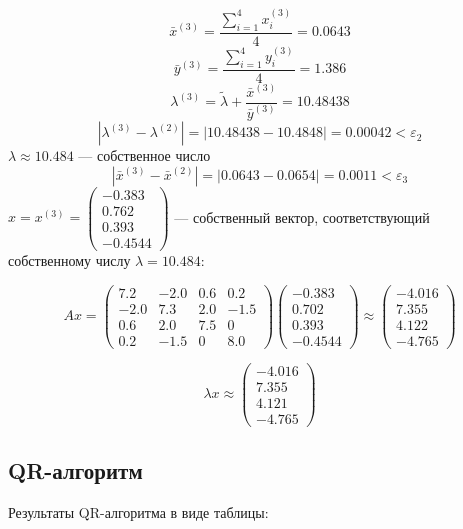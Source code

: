 \documentclass[a4paper,12pt,notitlepage,pdftex,headsepline]{scrartcl}
\begin{document}
\[\bar{x}^{\left(3\right)} = \frac{\sum\limits_{i=1}^4{x_i^{\left(3\right)} }}{4} = 0.0643\]
\[\bar{y}^{\left(3\right)} = \frac{\sum\limits_{i=1}^4{y_i^{\left(3\right)} }}{4} = 1.386\]
\[\lambda^{\left(3\right)}  = \tilde{\lambda} + \frac{\bar{x}^{\left(3\right)} }{\bar{y}^{\left(3\right)} } = 10.48438\]
\[\left|\lambda^{\left(3\right)} - \lambda^{\left(2\right)} \right| = \left|10.48438 - 10.4848\right| = 0.00042 < \varepsilon_2\]
$\lambda \approx 10.484$ --- собственное число
\[\left|\bar{x}^{\left(3\right)} - \bar{x}^{\left(2\right)} \right| = \left|0.0643 - 0.0654\right| = 0.0011 < \varepsilon_3\]
$x = x^{\left(3\right)}  = \left(\begin{matrix}
-0.383\\
0.762\\
0.393\\
-0.4544
\end{matrix}\right)$ --- собственный вектор, соответствующий собственному числу $\lambda = 10.484$:

\[
A x = \left( \begin{matrix}
7.2 & -2.0 & 0.6 & 0.2\\
-2.0 & 7.3 & 2.0 & -1.5\\
0.6 & 2.0 & 7.5 & 0\\
0.2 & -1.5 & 0 & 8.0
\end{matrix}\right) \left(\begin{matrix}
-0.383\\
0.702\\
0.393\\
-0.4544
\end{matrix}\right) \approx \left(\begin{matrix}
-4.016\\
7.355\\
4.122\\
-4.765
\end{matrix}\right)\]

\[\lambda x \approx \left(\begin{matrix}
-4.016\\
7.355\\
4.121\\
-4.765
\end{matrix}\right)\]
\subsection{QR-алгоритм}
Результаты QR-алгоритма в виде таблицы:
\end{document}
